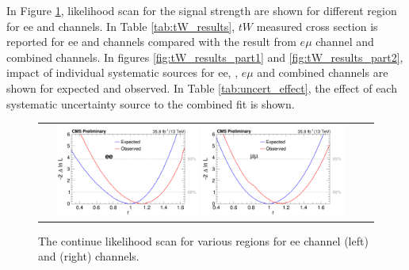 In Figure \ref{fig:scan}, likelihood scan for the signal strength are shown for different region for ee and \mumu channels.
In Table \ref{tab:tW_results}, $tW$ measured cross section is reported for ee and \mumu channels compared with the result from $e\mu$ channel and combined channels.
In figures \ref{fig:tW_results_part1} and \ref{fig:tW_results_part2}, impact of individual systematic sources for ee, \mumu, $e\mu$ and combined channels are shown for expected and observed.
In Table \ref{tab:uncert_effect}, the effect of each systematic uncertainty source to the combined fit is shown.

\begin{figure}[ht]
  \begin{center}
    \begin{tabular}{cc}
      \includegraphics[width=0.45\textwidth]{figures/tW/fig/tW_result/Result/scan_plot/ee__scan.png}
      \includegraphics[width=0.45\textwidth]{figures/tW/fig/tW_result/Result/scan_plot/mumu__scan.png}
    \end{tabular}
    \caption{The continue likelihood scan  for various regions for ee channel (left) and \mumu (right) channels.
    \label{fig:scan}}
  \end{center}
\end{figure}


